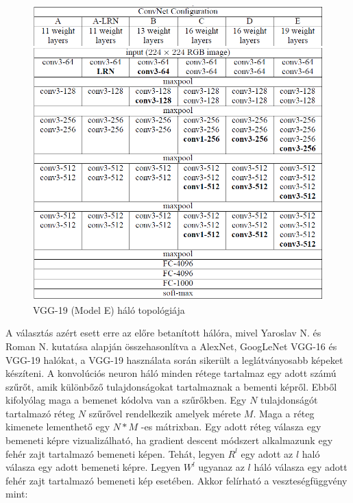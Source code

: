 \documentclass[12pt, a4paper, oneside]{book}
\theoremstyle{tetel}
\begin{document}
\begin{figure}[h]
	\begin{center}
		\includegraphics[scale=0.7]{VGG19.png}
		\caption{VGG-19 (Model E) háló topológiája\cite{29}}
		\label{vgg_19}
	\end{center}
\end{figure}

A választás azért esett erre az előre betanított hálóra, mivel Yaroslav N. és Roman N. kutatása alapján\cite{16} összehasonlítva a AlexNet, GoogLeNet VGG-16 és VGG-19 halókat, a VGG-19 használata során sikerült a leglátványosabb képeket készíteni.
\newline
\indent
A konvolúciós neuron háló minden rétege tartalmaz egy adott számú szűrőt, amik különbőző tulajdonságokat tartalmaznak a bementi képről. Ebből kifolyólag maga a bemenet kódolva van a szűrőkben. Egy \(N\) tulajdonságót tartalmazó réteg \(N\) szűrővel rendelkezik amelyek mérete \(M\). Maga a réteg kimenete lementhető egy \(N * M\) -es mátrixban. Egy adott réteg válasza egy bemeneti képre vizualizálható, ha gradient descent módszert alkalmazunk egy fehér zajt tartalmazó bemeneti képen. Tehát, legyen \(R^l\) egy adott az \(l\) haló válasza egy adott bemeneti képre. Legyen \(W^l\) ugyanaz az \(l\) háló válasza egy adott fehér zajt tartalmazó bemeneti kép esetében. Akkor felírható a veszteségfüggvény mint:
\end{document}
